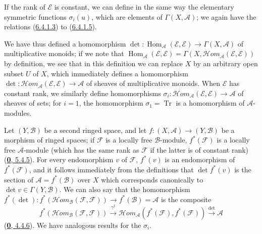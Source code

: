 \begin{env}[6.4.8]
If the rank of $\mathcal{E}$ is constant, we can define in the same way the
elementary symmetric functions $\sigma_i(u)$, which are elements of
$\Gamma(X,\mathcal{A})$; we again have the relations
(\hyperref[II.6.4.1.3]{6.4.1.3}) to
(\hyperref[II.6.4.1.5]{6.4.1.5}).


We have thus defined a homomorphism
$\det:\operatorname{Hom}_{\mathcal{A}}(\mathcal{E},\mathcal{E})
\to\Gamma(X,\mathcal{A})$ of multiplicative monoids; if we note that
$\operatorname{Hom}_{\mathcal{A}}(\mathcal{E},\mathcal{E})=
\Gamma(X,\mathcal{H}om_{\mathcal{A}}(\mathcal{E},\mathcal{E}))$ by
definition, we see that in this definition we can replace $X$ by an
arbitrary open subset $U$ of $X$, which immediately defines a homomorphism
$\det:\mathcal{H}om_{\mathcal{A}}(\mathcal{E},\mathcal{E})\to\mathcal{A}$ of
sheaves of multiplicative monoids. When $\mathcal{E}$ has constant rank, we
similarly define homomorphisms
$\sigma_i:\mathcal{H}om_{\mathcal{A}}(\mathcal{E},\mathcal{E})
\to\mathcal{A}$ of sheaves of sets; for $i=1$, the homomorphism
$\sigma_1=\operatorname{Tr}$ is a homomorphism of $\mathcal{A}$-modules.

Let $(Y,\mathcal{B})$ be a second ringed space, and let
$f:(X,\mathcal{A})\to(Y,\mathcal{B})$ be a morphism of ringed spaces; if
$\mathcal{F}$ is a locally free $\mathcal{B}$-module,
$f^*(\mathcal{F})$ is a locally free $\mathcal{A}$-module (which has the
same rank as $\mathcal{F}$ if the latter is of constant rank)
(\hyperref[0.5.4.5]{\textbf{0}, 5.4.5}). For every endomorphism $v$ of
$\mathcal{F}$, $f^*(v)$ is an endomorphism of $f^*(\mathcal{F})$, and it
follows immediately from the definitions that $\det f^*(v)$ is the section of
$\mathcal{A}=f^*(\mathcal{B})$ over $X$ which corresponds canonically to
$\det v\in\Gamma(Y,\mathcal{B})$. We can also say that the homomorphism
$f^*(\det):f^*(\mathcal{H}om_{\mathcal{B}}(\mathcal{F},\mathcal{F}))
\to f^*(\mathcal{B})=\mathcal{A}$ is the composite
\[
f^*(\mathcal{H}om_{\mathcal{B}}(\mathcal{F},\mathcal{F}))
\xrightarrow{\gamma^\sharp}
\mathcal{H}om_{\mathcal{A}}(f^*(\mathcal{F}),f^*(\mathcal{F}))
\xrightarrow{\det}\mathcal{A}
\]
(\hyperref[0.4.4.6]{\textbf{0}, 4.4.6}). We have analogous results for the
$\sigma_i$.
\end{env}

